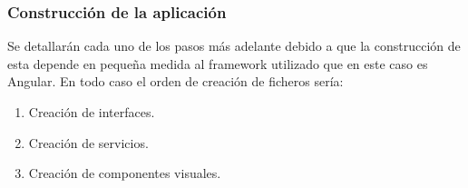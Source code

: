 \subsubsection{Construcción de la aplicación}
Se detallarán cada uno de los pasos más adelante debido a que la construcción de esta depende en pequeña medida al framework utilizado que en este caso es Angular. En todo caso el orden de creación de ficheros sería:
\begin{enumerate}
    \item Creación de interfaces.
    \item Creación de servicios.
    \item Creación de componentes visuales.
\end{enumerate}